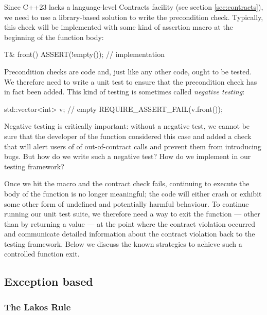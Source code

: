Since C++23 lacks a language-level Contracts facility (see section \ref{sec:contracts}), we need to use a library-based solution to write the precondition check. Typically, this check will be implemented with some kind of assertion macro at the beginning of the function body:
\begin{codeblock}
T& front() {
  ASSERT(!empty());
  // implementation
}
\end{codeblock}


Precondition checks are code and, just like any other code, ought to be tested. We therefore need to write a unit test to ensure that the precondition check has in fact been added. This kind of testing is sometimes called \emph{negative testing}:

\begin{codeblock}
std::vector<int> v;  // empty
REQUIRE_ASSERT_FAIL(v.front());
\end{codeblock}
Negative testing is critically important: without a negative test, we cannot be sure that the developer of the  function considered this case and added a check that will alert users of  of out-of-contract calls and prevent them from introducing bugs.
But how do we write such a negative test? How do we implement  in our testing framework?

Once we hit the  macro and the contract check fails, continuing to execute the body of the function is no longer meaningful; the code will either crash or exhibit some other form of undefined and potentially harmful behaviour. To continue running our unit test suite, we therefore need a way to exit the function --- other than by returning a value --- at the point where the contract violation occurred and communicate detailed information about the contract violation back to the testing framework. Below we discuss the known strategies to achieve such a controlled function exit.

\subsection{Exception based}

\subsubsection{The Lakos Rule}


